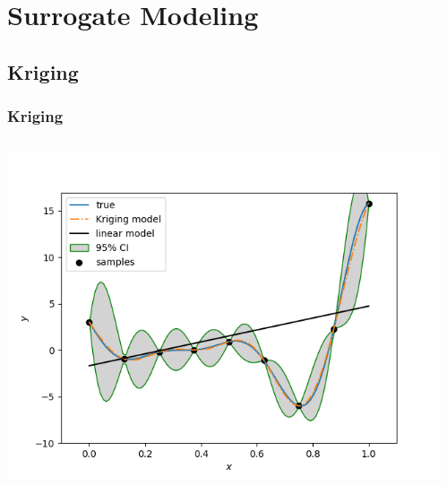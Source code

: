 \documentclass{beamer}
\theoremstyle{remark}
\theoremstyle{plain}
\begin{document}
\section{Surrogate Modeling}
\label{sec:partie0}


\subsection{Kriging}
\begin{frame}
  \frametitle{Kriging}
  \begin{columns}
    \begin{column}{0.65\linewidth}
      \begin{center}
        \includegraphics[width=0.95\linewidth]{Kriging/lmkmvar}
      \end{center}
    \end{column}
    \begin{column}{0.35\linewidth}
      \begin{center}

\end{center}
\end{column}
\end{columns}
\end{frame}
\end{document}
